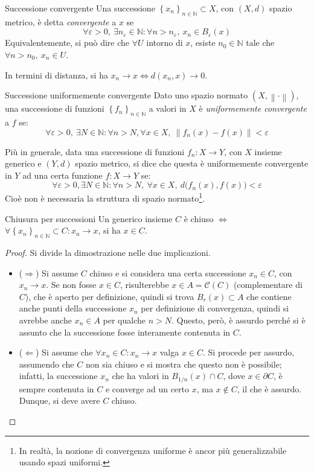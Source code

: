 \documentclass[11pt, a4paper]{scrartcl}
\theoremstyle{definition}
\numberwithin{esempio}{section}
\theoremstyle{definition}
\numberwithin{obs}{section}
\numberwithin{nota}{section}
\numberwithin{equation}{subsection}
\begin{document}
\begin{definizione}
	{Successione convergente}{}
	Una successione $\left\{ x_n \right\} _{n\in \mathbb{N}} \subset X$, con $(X,d)$ spazio metrico, \`e detta \textit{convergente} a $x$ se
	\[
	\forall \varepsilon >0, \ \exists n_\varepsilon \in \mathbb{N}: \forall n>n_\varepsilon , \ x_n \in B_\varepsilon (x)
	\] 
	Equivalentemente, si pu\`o dire che $\forall U$ intorno di $x$, esiste $n_0 \in \mathbb{N}$ tale che $\forall n>n_0, \ x_n \in U$.
\end{definizione}
\noindent In termini di distanza, si ha $x_n \to x \iff d(x_n,x) \to 0$.
\begin{definizione}
	{Successione uniformemente convergente}{}
Dato uno spazio normato $(X,\left\lVert \cdot  \right\rVert )$, una successione di funzioni $\left\{ f_n \right\} _{n\in \mathbb{N}} $ a valori in $X$ \`e \textit{uniformemente convergente} a $f$ se:
\[
\forall \varepsilon >0, \ \exists N \in \mathbb{N} : \forall n > N, \forall x \in X, \ \left\lVert f_n(x) - f(x) \right\rVert < \varepsilon 
\] 
\end{definizione}
\noindent Pi\`u in generale, data una successione di funzioni $f_n : X\to Y$, con $X$ insieme generico e $(Y,d)$ spazio metrico, si dice che questa \`e uniformemente convergente in $Y$ ad una certa funzione $f:X\to Y$ se:
\[
\forall \varepsilon >0, \exists N\in \mathbb{N} : \forall n > N, \ \forall x \in X, \  d\big(f_n(x), f(x)\big) < \varepsilon 
\] 
Cio\`e non \`e necessaria la struttura di spazio normato\footnote{In realt\`a, la nozione di convergenza uniforme \`e ancor pi\`u generalizzabile usando spazi uniformi.}.
\begin{prop}
	{Chiusura per successioni}{}
	Un generico insieme $C$ \`e chiuso $\iff$ $\forall \left\{ x _n \right\}_{n \in \mathbb{N}} \subset C : x_n \to x$, si ha $x \in C$.
	\begin{proof}
		Si divide la dimostrazione nelle due implicazioni.
		\begin{itemize}
			\item ($\Rightarrow $) Si assume $C$ chiuso e si considera una certa successione $x_n \in C$, con $x_n \to x$.
				Se non fosse $x \in C$, risulterebbe $x \in A=\mathcal{C} (C) $ (complementare di $C$), che \`e aperto per definizione, quindi si trova $B_r(x) \subset A$ che contiene anche punti della successione $x_n$ per definizione di convergenza, quindi si avrebbe anche $x_n \in A$ per qualche $n > N$.
				Questo, per\`o, \`e assurdo perch\'e si \`e assunto che la successione fosse interamente contenuta in $C$.
			\item ($\Leftarrow$) Si assume che $\forall x_n \in C : x_n \to x$ valga $x \in C$.
				Si procede per assurdo, assumendo che $C$ non sia chiuso e si mostra che questo non \`e possibile; infatti, la successione $x_n$ che ha valori in $B_{1 / n} (x) \cap C$, dove $x \in \partial C$, \`e sempre contenuta in $C$ e converge ad un certo $x$, ma $x \not \in C$, il che \`e assurdo.
				Dunque, si deve avere $C$ chiuso.
		\end{itemize}
	\end{proof}
\end{prop}
\end{document}
